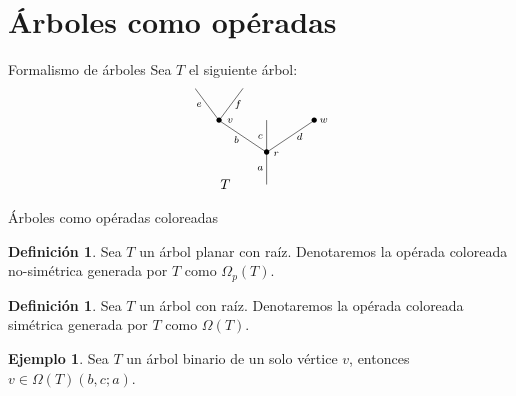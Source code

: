 \documentclass[12pt,aspectratio=169]{beamer}
\numberwithin{equation}{section}
\theoremstyle{definition}
\newtheorem{defi}[teo]{Definici\'on}
\newtheorem{ex}[teo]{Ejemplo}
\begin{document}
{\section{\'Arboles como op\'eradas}

\begin{frame}{Formalismo de \'arboles}
    Sea $T$ el siguiente \'arbol:
    $$
        \xy
        <0.08cm, 0cm>:
        (0.0, 0.0)*{}="1"; %
        (0.0, 10.0)*=0{\bullet}="2"; %
        (-15.0, 20.0)*=0{\bullet}="3"; %
        (-22.5, 30.0)*{}="4"; %
        (-7.5, 30.0)*{}="5"; %
        (0.0, 20.0)*{}="6"; %
        (15.0, 20.0)*=0{\bullet}="7"; %
        "1";"2" **\dir{-};
        "2";"3" **\dir{-};
        "3";"4" **\dir{-};
        "3";"5" **\dir{-};
        "2";"6" **\dir{-};
        "2";"7" **\dir{-};
        (3.0, 9.5)*=0{\scriptstyle r};
        (-11.5, 20.0)*=0{\scriptstyle v};
        (-2.0, 5.0)*=0{\scriptstyle a};
        (-9.5, 14.0)*=0{\scriptstyle b};
        (-21.3, 25.0)*=0{\scriptstyle e};
        (-9, 25.0)*=0{\scriptstyle f};
        (-2.0, 15.0)*=0{\scriptstyle c};
        (10.4, 15.0)*=0{\scriptstyle d};
        (18.0, 20.0)*=0{\scriptstyle w};
        (-13,0)*{T};
        \endxy
    $$

\end{frame}
\begin{frame}{\'Arboles como op\'eradas coloreadas}
    \begin{defi}
        Sea $T$ un \'arbol planar con ra\'iz. Denotaremos la op\'erada coloreada no-sim\'etrica generada por $T$ como $\Omega_p(T)$.
    \end{defi}
    \begin{defi}
        Sea $T$ un \'arbol con ra\'iz. Denotaremos la op\'erada coloreada sim\'etrica generada por $T$ como $\Omega(T)$.
    \end{defi}
    \begin{ex}
        Sea $T$ un \'arbol binario de un solo v\'ertice $v$, entonces $v\in \Omega(T)(b,c;a)$.
    \end{ex}
\end{frame}

}
\end{document}
